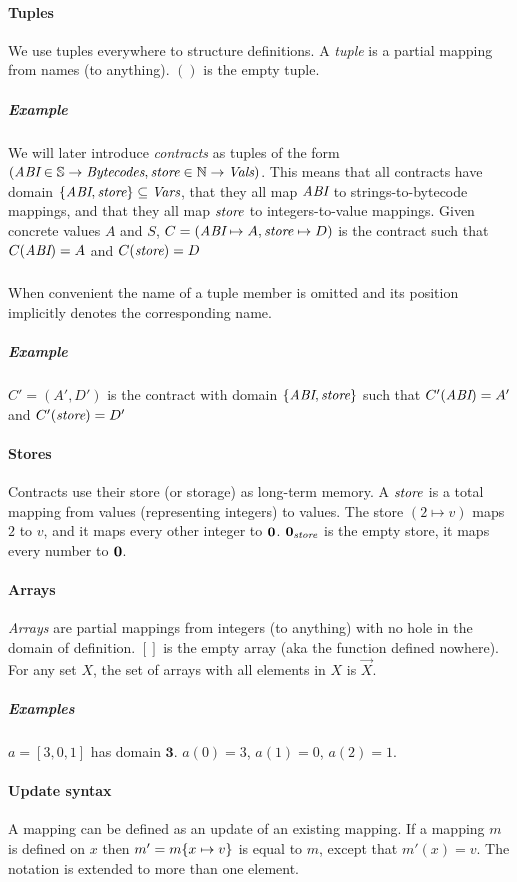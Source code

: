 \documentclass[12pt]{extarticle}
\begin{document}
\paragraph{Tuples}
We use tuples everywhere to structure definitions. A \emph{tuple} is a partial mapping from names (to anything). $()$ is the empty tuple.

\subparagraph{Example} 
We will later introduce \emph{contracts} as tuples of the form $(\textit{ABI}\in\mathbb{S}\rightarrow\textit{Bytecodes},\textit{store}\in\mathbb{N}\rightarrow\textit{Vals})$. 
This means that all contracts have domain $\{\textit{ABI},\textit{store}\}\subseteq\textit{Vars}$, that they all map $\textit{ABI}$ to strings-to-bytecode mappings, and that they all map $\textit{store}$ to integers-to-value mappings.
Given concrete values $A$ and $S$, $C = (\textit{ABI}\mapsto A,\textit{store}\mapsto D)$ is the contract such that $C(\textit{ABI}) = A$ and $C(\textit{store}) = D$

\subparagraph{}
When convenient the name of a tuple member is omitted and its position implicitly denotes the corresponding name. 
\subparagraph{Example}
$C' = (A',D')$ is the contract with domain $\{\textit{ABI},\textit{store}\}$ such that $C'(\textit{ABI}) = A'$ and $C'(\textit{store}) = D'$

\paragraph{Stores} Contracts use their store (or storage) as long-term memory. A $\textit{store}$ is a total mapping from values (representing integers) to values. The store $(2\mapsto v)$ maps $2$ to $v$, and it maps every other integer to $\mathbf{0}$. $\mathbf{0}_\textit{store}$ is the empty store, it maps every number to $\mathbf{0}$.

\paragraph{Arrays}
\emph{Arrays} are partial mappings from integers (to anything) with no hole in the domain of definition. $[]$ is the empty array (aka the function defined nowhere). For any set $X$, the set of arrays with all elements in $X$ is $\vec X$.
\subparagraph{Examples}
$a = [3,0,1]$ has domain $\mathbf{3}$. $a(0) = 3$, $a(1) = 0$, $a(2) = 1$.

\def\Dom{\textrm{Dom}}
\paragraph{Update syntax}
A mapping can be defined as an update of an existing mapping. If a mapping $m$ is defined on $x$ then $m' = m\{x\mapsto v\}$ is equal to $m$, except that $m'(x) =v$. The notation is extended to more than one element.
\end{document}
